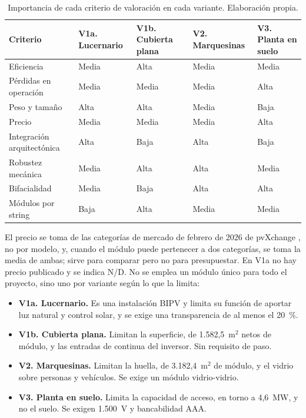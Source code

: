 \begin{table}[htbp]
    \centering
    \caption{Importancia de cada criterio de valoración en cada variante. Elaboración propia.}
    \label{tab:diseno-importancia-criterios}
    \footnotesize
    \renewcommand{\arraystretch}{1.15}
    \begin{tabularx}{\textwidth}{|F{4.2cm}|Y|Y|Y|Y|}
        \hline
        \textbf{Criterio} & \textbf{V1a. Lucernario} & \textbf{V1b. Cubierta plana} & \textbf{V2. Marquesinas} & \textbf{V3. Planta en suelo} \\
        \hline
        Eficiencia & Media & Alta & Media & Media \\
        \hline
        Pérdidas en operación & Media & Media & Media & Alta \\
        \hline
        Peso y tamaño & Alta & Alta & Media & Baja \\
        \hline
        Precio & Media & Media & Media & Alta \\
        \hline
        Integración arquitectónica & Alta & Baja & Alta & Baja \\
        \hline
        Robustez mecánica & Media & Alta & Alta & Media \\
        \hline
        Bifacialidad & Media & Baja & Alta & Alta \\
        \hline
        Módulos por string & Baja & Alta & Media & Media \\
        \hline
    \end{tabularx}
\end{table}

El precio se toma de las categorías de mercado de febrero de 2026 de pvXchange \cite{PvXchangePrecios2026}, no por modelo, y, cuando el módulo puede pertenecer a dos categorías, se toma la media de ambas; sirve para comparar pero no para presupuestar. En V1a no hay precio publicado y se indica N/D. No se emplea un módulo único para todo el proyecto, sino uno por variante según lo que la limita:

\begin{itemize}
    \item \textbf{V1a. Lucernario.} Es una instalación \ac{BIPV} y limita su función de aportar luz natural y control solar, y se exige una transparencia de al menos el 20~\%.
    \item \textbf{V1b. Cubierta plana.} Limitan la superficie, de 1.582,5~m$^2$ netos de módulo, y las entradas de continua del inversor. Sin requisito de paso.
    \item \textbf{V2. Marquesinas.} Limitan la huella, de 3.182,4~m$^2$ de módulo, y el vidrio sobre personas y vehículos. Se exige un módulo vidrio-vidrio.
    \item \textbf{V3. Planta en suelo.} Limita la capacidad de acceso, en torno a 4,6~MW, y no el suelo. Se exigen 1.500~V y bancabilidad AAA.
\end{itemize}


